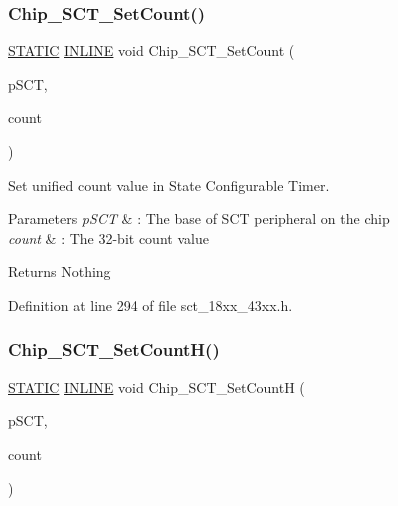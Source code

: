\subsubsection{\texorpdfstring{Chip\+\_\+\+S\+C\+T\+\_\+\+Set\+Count()}{Chip\_SCT\_SetCount()}}
{\footnotesize\ttfamily \hyperlink{group___l_p_c___types___public___macros_ga10b2d890d871e1489bb02b7e70d9bdfb}{S\+T\+A\+T\+IC} \hyperlink{spifi__18xx__43xx_8h_a2eb6f9e0395b47b8d5e3eeae4fe0c116}{I\+N\+L\+I\+NE} void Chip\+\_\+\+S\+C\+T\+\_\+\+Set\+Count (\begin{DoxyParamCaption}\item[{\hyperlink{struct_l_p_c___s_c_t___t}{L\+P\+C\+\_\+\+S\+C\+T\+\_\+T} $\ast$}]{p\+S\+CT,  }\item[{uint32\+\_\+t}]{count }\end{DoxyParamCaption})}



Set unified count value in State Configurable Timer. 


\begin{DoxyParams}{Parameters}
{\em p\+S\+CT} & \+: The base of S\+CT peripheral on the chip \\
\hline
{\em count} & \+: The 32-\/bit count value \\
\hline
\end{DoxyParams}
\begin{DoxyReturn}{Returns}
Nothing 
\end{DoxyReturn}


Definition at line 294 of file sct\+\_\+18xx\+\_\+43xx.\+h.

\mbox{\label{group___s_c_t__18_x_x__43_x_x_ga794c84cef2db6931829894139eb6d514}} 
\subsubsection{\texorpdfstring{Chip\+\_\+\+S\+C\+T\+\_\+\+Set\+Count\+H()}{Chip\_SCT\_SetCountH()}}
{\footnotesize\ttfamily \hyperlink{group___l_p_c___types___public___macros_ga10b2d890d871e1489bb02b7e70d9bdfb}{S\+T\+A\+T\+IC} \hyperlink{spifi__18xx__43xx_8h_a2eb6f9e0395b47b8d5e3eeae4fe0c116}{I\+N\+L\+I\+NE} void Chip\+\_\+\+S\+C\+T\+\_\+\+Set\+CountH (\begin{DoxyParamCaption}\item[{\hyperlink{struct_l_p_c___s_c_t___t}{L\+P\+C\+\_\+\+S\+C\+T\+\_\+T} $\ast$}]{p\+S\+CT,  }\item[{uint16\+\_\+t}]{count }\end{DoxyParamCaption})}



